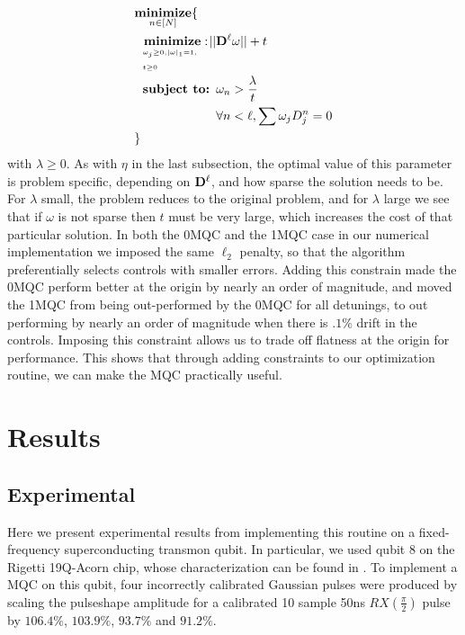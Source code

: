 \documentclass[aps,nofootinbib,pra,notitlepage,twocolumn]{revtex4-1}
\begin{document}
\begin{equation}\label{eq:minimization_regularization}
\begin{split}
&\underset{n\in[N]}{\textbf{minimize}}\{\\
&\ \ \bunderbrace{\textbf{minimize}: }{\omega_j\geq0, |\omega|_1=1,\\ t\geq0} ||{\bold{D}^{\ell}}\omega|| + t\\
&\ \ \textbf{subject to: } \omega_n > \frac{\lambda}{t}\\
&\ \ \phantom{\textbf{subject to: }} \forall n<\ell, \sum \omega_jD_j^n=0\\
&\}
\end{split}
\end{equation} with $\lambda\geq0$. As with $\eta$ in the last subsection, the optimal value of this parameter is problem specific, depending on $\bold{D}^\ell$, and how sparse the solution needs to be. For $\lambda$ small, the problem reduces to the original problem, and for $\lambda$ large we see that if $\omega$ is not sparse then $t$ must be very large, which increases the cost of that particular solution.
In both the 0MQC and the 1MQC case in our numerical implementation we imposed the same $\ell_2$ penalty, so that the algorithm preferentially selects controls with smaller errors. Adding this constrain made the 0MQC perform better at the origin by nearly an order of magnitude, and moved the 1MQC from being out-performed by the 0MQC for all detunings, to out performing by nearly an order of magnitude when there is $.1\%$ drift in the controls. Imposing this constraint allows us to trade off flatness at the origin for performance. This shows that through adding constraints to our optimization routine, we can make the MQC practically useful. 
\section{Results} %
\label{sec:results}


\subsection{Experimental} %
\label{sub:experimental}
Here we present experimental results from implementing this routine on a fixed-frequency superconducting transmon qubit. In particular, we used qubit 8 on the Rigetti 19Q-Acorn chip, whose characterization can be found in \cite{1712.05771}. To implement a MQC on this qubit, four incorrectly calibrated Gaussian pulses were produced by scaling the pulseshape amplitude for a calibrated 10 sample 50ns $RX(\frac{\pi}{2})$ pulse by $106.4\%$,  $103.9\%$, $93.7\%$ and $91.2\%$.
\end{document}
